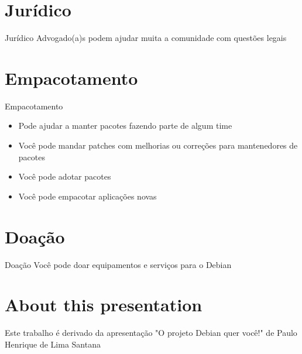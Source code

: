 \documentclass[10pt, compress, aspectratio=169]{beamer}
\begin{document}
\section{Jurídico}

\begin{frame}{Jurídico}
  Advogado(a)s podem ajudar muita a comunidade com questões legais
\end{frame}

\section{Empacotamento}

\begin{frame}{Empacotamento}
  \begin{itemize}
    \item Pode ajudar a manter pacotes fazendo parte de algum time
    \item Você pode mandar patches com melhorias ou correções para mantenedores
          de pacotes
    \item Você pode adotar pacotes
    \item Você pode empacotar aplicações novas
  \end{itemize}
\end{frame}

\section{Doação}

\begin{frame}{Doação}
  Você pode doar equipamentos e serviços para o Debian
\end{frame}

\section{About this presentation}
\begin{frame}[standout]
    Este trabalho é derivado da apresentação "O projeto Debian quer você!" de
    Paulo Henrique de Lima Santana
   \begin{center}\ccbysa\end{center}
\end{frame}

\maketitle
\end{document}
